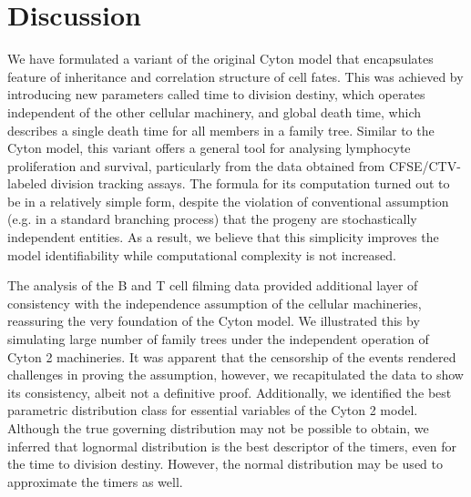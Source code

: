 \documentclass[11pt, a4paper]{article}
\begin{document}
\nolinenumbers
\section{Discussion}
\linenumbers
We have formulated a variant of the original Cyton model that encapsulates feature of inheritance and correlation structure of cell fates. This was achieved by introducing new parameters called time to division destiny, which operates independent of the other cellular machinery, and global death time, which describes a single death time for all members in a family tree. Similar to the Cyton model, this variant offers a general tool for analysing lymphocyte proliferation and survival, particularly from the data obtained from CFSE/CTV-labeled division tracking assays. The formula for its computation turned out to be in a relatively simple form, despite the violation of conventional assumption (e.g. in a standard branching process) that the progeny are stochastically independent entities. As a result, we believe that this simplicity improves the model identifiability while computational complexity is not increased. 

The analysis of the B and T cell filming data provided additional layer of consistency with the independence assumption of the cellular machineries, reassuring the very foundation of the Cyton model. We illustrated this by simulating large number of family trees under the independent operation of Cyton 2 machineries. It was apparent that the censorship of the events rendered challenges in proving the assumption, however, we recapitulated the data to show its consistency, albeit not a definitive proof. Additionally, we identified the best parametric distribution class for essential variables of the Cyton 2 model. Although the true governing distribution may not be possible to obtain, we inferred that lognormal distribution is the best descriptor of the timers, even for the time to division destiny. However, the normal distribution may be used to approximate the timers as well.
\end{document}
